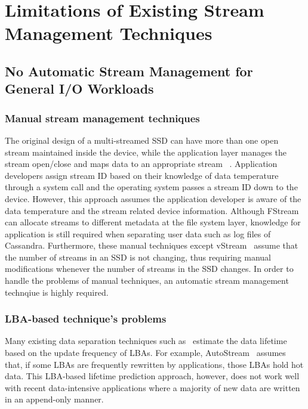 \section{Limitations of Existing Stream Management Techniques}
\subsection{No Automatic Stream Management for General I/O Workloads}
\subsubsection{Manual stream management techniques}

The original design of a multi-streamed SSD can have more
than one open stream maintained inside the device, while the
application layer manages the stream open/close and maps data to an appropriate stream
~\cite{MultiStream, Level, vStream}.
Application developers assign stream ID based on their knowledge of
data temperature through a system call and the operating
system passes a stream ID down to the device. However,
this approach assumes the application developer is aware of the data
temperature and the stream related device information. 
Although \textsf{\small FStream}~\cite{FStream} can allocate streams to different metadata
at the file system layer, knowledge for application is still required when separating
user data such as log files of Cassandra.
Furthermore, these manual techniques except \textsf{\small vStream}~\cite{vStream} assume 
that the number of streams in an SSD is not changing, 
thus requiring manual modifications whenever the number of streams in the SSD changes.
In order to handle the problems of manual techniques, an automatic stream management
technqiue is highly required.

\subsubsection{LBA-based technique's problems}
Many existing data separation techniques such as~\cite{AutoStream, HotCold} 
estimate the data lifetime based on the update frequency of LBAs.  
For example, \textsf{\small AutoStream}~\cite{AutoStream} assumes that, if
some LBAs are frequently rewritten by applications, those LBAs hold hot data.
This LBA-based lifetime prediction 
approach, however, does not work well with recent data-intensive 
applications where a majority of
new data are written in an append-only manner.  

